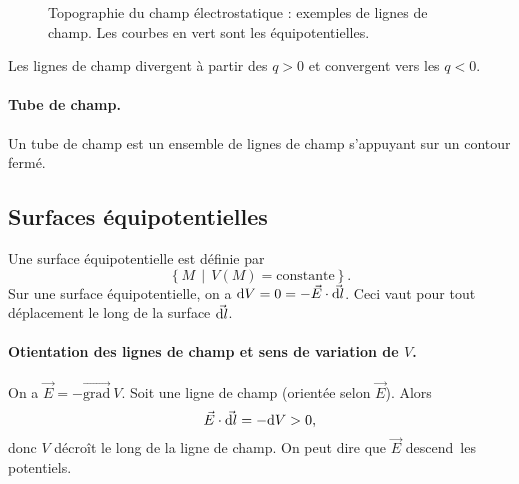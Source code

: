 \begin{figure}
            \caption[Topographie du champ électrostatique : exemples de lignes de champ.]{Topographie du champ électrostatique : exemples de lignes de champ. Les courbes en vert sont les équipotentielles.}
            \label{fig:ligne_de_champ_electrostatique}
        \end{figure}

        Les lignes de champ divergent à partir des $q>0$ et convergent vers les $q<0$.

        \paragraph{Tube de champ.}
        Un tube de champ est un ensemble de lignes de champ s'appuyant sur un contour fermé.

    \subsection{Surfaces équipotentielles}

        Une surface équipotentielle est définie par
        \begin{equation}
            \left\lbrace M\,\middle|\, V(M)=\text{constante}\right\rbrace.
        \end{equation}
        Sur une surface équipotentielle, on a $\mathrm{d} V=0=-\vec{E}\cdot\vec{\mathrm{d} l}$. Ceci vaut pour tout déplacement le long de la surface $\vec{\mathrm{d} l}$.

        \paragraph{Otientation des lignes de champ et sens de variation de $V$.}
        On a $\vec{E}=-\vec{\text{grad}}~V$. Soit une ligne de champ (orientée selon $\vec{E}$). Alors 
        \begin{equation}
            \vec{E}\cdot\vec{\mathrm{d} l}=-\mathrm{d} V>0,
        \end{equation}
        donc $V$ décroît le long de la ligne de champ. On peut dire que $\vec{E}$ \og descend\fg~les potentiels.

